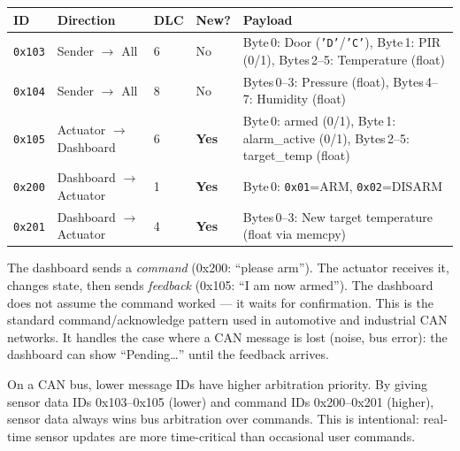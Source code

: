 \documentclass[11pt,a4paper]{article}
\begin{document}
\begin{table}[h]
\centering
\begin{tabular}{@{}llllp{7cm}@{}}
\toprule
\textbf{ID} & \textbf{Direction} & \textbf{DLC} & \textbf{New?} & \textbf{Payload} \\
\midrule
\texttt{0x103} & Sender $\rightarrow$ All & 6 & No & Byte\,0: Door (\texttt{'D'}/\texttt{'C'}), Byte\,1: PIR (0/1), Bytes\,2--5: Temperature (float) \\
\texttt{0x104} & Sender $\rightarrow$ All & 8 & No & Bytes\,0--3: Pressure (float), Bytes\,4--7: Humidity (float) \\
\texttt{0x105} & Actuator $\rightarrow$ Dashboard & 6 & \textbf{Yes} & Byte\,0: armed (0/1), Byte\,1: alarm\_active (0/1), Bytes\,2--5: target\_temp (float) \\
\texttt{0x200} & Dashboard $\rightarrow$ Actuator & 1 & \textbf{Yes} & Byte\,0: \texttt{0x01}=ARM, \texttt{0x02}=DISARM \\
\texttt{0x201} & Dashboard $\rightarrow$ Actuator & 4 & \textbf{Yes} & Bytes\,0--3: New target temperature (float via memcpy) \\
\bottomrule
\end{tabular}
\end{table}

\begin{infobox}
The dashboard sends a \emph{command} (0x200: ``please arm''). The actuator receives it, changes state, then sends \emph{feedback} (0x105: ``I am now armed''). The dashboard does not assume the command worked --- it waits for confirmation. This is the standard command/acknowledge pattern used in automotive and industrial CAN networks. It handles the case where a CAN message is lost (noise, bus error): the dashboard can show ``Pending\ldots'' until the feedback arrives.
\end{infobox}

\begin{infobox}
On a CAN bus, lower message IDs have higher arbitration priority. By giving sensor data IDs 0x103--0x105 (lower) and command IDs 0x200--0x201 (higher), sensor data always wins bus arbitration over commands. This is intentional: real-time sensor updates are more time-critical than occasional user commands.
\end{infobox}

\newpage

\end{document}
